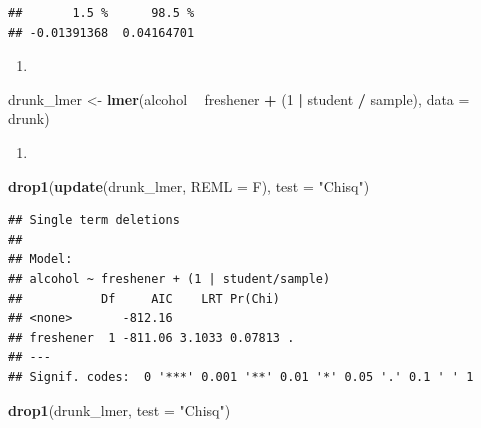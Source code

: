 \documentclass[]{book}
\newenvironment{Shaded}{\begin{snugshade}}{\end{snugshade}}
\newcommand{\KeywordTok}[1]{\textcolor[rgb]{0.13,0.29,0.53}{\textbf{#1}}}
\newcommand{\DataTypeTok}[1]{\textcolor[rgb]{0.13,0.29,0.53}{#1}}
\newcommand{\DecValTok}[1]{\textcolor[rgb]{0.00,0.00,0.81}{#1}}
\newcommand{\StringTok}[1]{\textcolor[rgb]{0.31,0.60,0.02}{#1}}
\newcommand{\OperatorTok}[1]{\textcolor[rgb]{0.81,0.36,0.00}{\textbf{#1}}}
\newcommand{\NormalTok}[1]{#1}
\theoremstyle{definition}
\theoremstyle{definition}
\theoremstyle{definition}
\theoremstyle{remark}
\begin{document}
\begin{verbatim}
##       1.5 %      98.5 % 
## -0.01391368  0.04164701
\end{verbatim}

\normalsize

\begin{enumerate}
\def\labelenumi{\arabic{enumi}.}
\setcounter{enumi}{2}
\item
\end{enumerate}

\small

\begin{Shaded}
\begin{Highlighting}[]
\NormalTok{drunk_lmer <-}\StringTok{ }\KeywordTok{lmer}\NormalTok{(alcohol }\OperatorTok{~}\StringTok{ }\NormalTok{freshener }\OperatorTok{+}\StringTok{ }
\StringTok{    }\NormalTok{(}\DecValTok{1} \OperatorTok{|}\StringTok{ }\NormalTok{student }\OperatorTok{/}\StringTok{ }\NormalTok{sample), }\DataTypeTok{data =}\NormalTok{ drunk)}
\end{Highlighting}
\end{Shaded}

\normalsize

\begin{enumerate}
\def\labelenumi{\arabic{enumi}.}
\setcounter{enumi}{3}
\item
\end{enumerate}

\scriptsize

\begin{Shaded}
\begin{Highlighting}[]
\KeywordTok{drop1}\NormalTok{(}\KeywordTok{update}\NormalTok{(drunk_lmer, }\DataTypeTok{REML =}\NormalTok{ F), }
    \DataTypeTok{test =} \StringTok{"Chisq"}\NormalTok{)}
\end{Highlighting}
\end{Shaded}

\begin{verbatim}
## Single term deletions
## 
## Model:
## alcohol ~ freshener + (1 | student/sample)
##           Df     AIC    LRT Pr(Chi)  
## <none>       -812.16                 
## freshener  1 -811.06 3.1033 0.07813 .
## ---
## Signif. codes:  0 '***' 0.001 '**' 0.01 '*' 0.05 '.' 0.1 ' ' 1
\end{verbatim}

\begin{Shaded}
\begin{Highlighting}[]
\KeywordTok{drop1}\NormalTok{(drunk_lmer, }\DataTypeTok{test =} \StringTok{"Chisq"}\NormalTok{)}
\end{Highlighting}
\end{Shaded}
\end{document}
